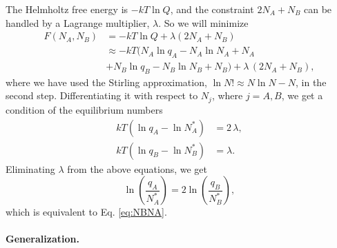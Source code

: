 \documentclass[twocolumn, 10pt]{article}
\numberwithin{equation}{section}
\newenvironment{solution}[1][\empty]
{\par\medskip\sffamily
  \textbf{\ifx\empty#1{Solution.}\relax\else{#1}\fi} \ignorespaces}
{\medskip}
\begin{document}
\begin{solution}
  The Helmholtz free energy is $-kT \ln Q$,
  and the constraint $2 N_A + N_B$ can be handled by a Lagrange multiplier, $\lambda$.
  So we will minimize
  \begin{align*}
  F(N_A, N_B)
    &= -k T \ln Q + \lambda(2 N_A + N_B)
    \\
    &\approx -kT (N_A \ln q_A - N_A \ln N_A + N_A \\
    &
              +   N_B \ln q_B - N_B \ln N_B + N_B)
            + \lambda \, (2 N_A + N_B)
    ,
  \end{align*}
  where we have used the Stirling approximation,
  $\ln N! \approx N\ln N - N$, in the second step.
  Differentiating it with respect to $N_j$, where $j = A, B$,
  we get a condition of the equilibrium numbers
  \begin{align*}
    kT (\ln q_A - \ln N_A^*) &= 2 \, \lambda, \\
    kT (\ln q_B - \ln N_B^*) &= \lambda.
  \end{align*}
  Eliminating $\lambda$ from the above equations, we get
  $$
  \ln\left(\frac{q_A}{N_A^*}\right) = 2 \ln\left(\frac{q_B}{N_B^*}\right),
  $$
  which is equivalent to Eq. \eqref{eq:NBNA}.

  \paragraph*{Generalization.}


\end{solution}
\end{document}
